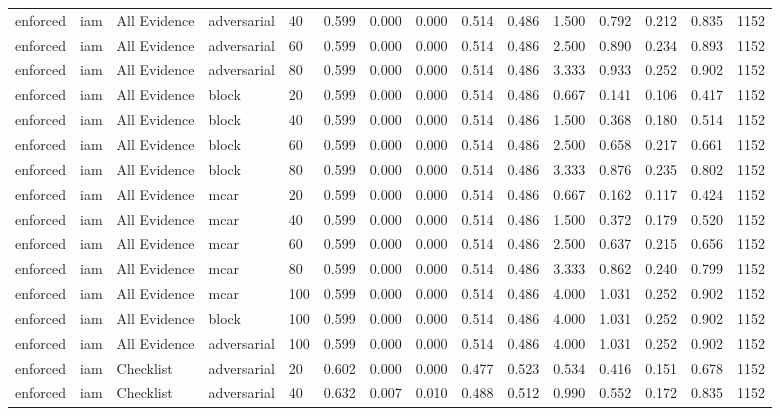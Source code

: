 \begin{table}[!ht]
{\begin{tabular}{lllllllllllllll}
enforced & iam & All Evidence & adversarial & 40 & 0.599 & 0.000 & 0.000 & 0.514 & 0.486 & 1.500 & 0.792 & 0.212 & 0.835 & 1152 \\
enforced & iam & All Evidence & adversarial & 60 & 0.599 & 0.000 & 0.000 & 0.514 & 0.486 & 2.500 & 0.890 & 0.234 & 0.893 & 1152 \\
enforced & iam & All Evidence & adversarial & 80 & 0.599 & 0.000 & 0.000 & 0.514 & 0.486 & 3.333 & 0.933 & 0.252 & 0.902 & 1152 \\
enforced & iam & All Evidence & block & 20 & 0.599 & 0.000 & 0.000 & 0.514 & 0.486 & 0.667 & 0.141 & 0.106 & 0.417 & 1152 \\
enforced & iam & All Evidence & block & 40 & 0.599 & 0.000 & 0.000 & 0.514 & 0.486 & 1.500 & 0.368 & 0.180 & 0.514 & 1152 \\
enforced & iam & All Evidence & block & 60 & 0.599 & 0.000 & 0.000 & 0.514 & 0.486 & 2.500 & 0.658 & 0.217 & 0.661 & 1152 \\
enforced & iam & All Evidence & block & 80 & 0.599 & 0.000 & 0.000 & 0.514 & 0.486 & 3.333 & 0.876 & 0.235 & 0.802 & 1152 \\
enforced & iam & All Evidence & mcar & 20 & 0.599 & 0.000 & 0.000 & 0.514 & 0.486 & 0.667 & 0.162 & 0.117 & 0.424 & 1152 \\
enforced & iam & All Evidence & mcar & 40 & 0.599 & 0.000 & 0.000 & 0.514 & 0.486 & 1.500 & 0.372 & 0.179 & 0.520 & 1152 \\
enforced & iam & All Evidence & mcar & 60 & 0.599 & 0.000 & 0.000 & 0.514 & 0.486 & 2.500 & 0.637 & 0.215 & 0.656 & 1152 \\
enforced & iam & All Evidence & mcar & 80 & 0.599 & 0.000 & 0.000 & 0.514 & 0.486 & 3.333 & 0.862 & 0.240 & 0.799 & 1152 \\
enforced & iam & All Evidence & mcar & 100 & 0.599 & 0.000 & 0.000 & 0.514 & 0.486 & 4.000 & 1.031 & 0.252 & 0.902 & 1152 \\
enforced & iam & All Evidence & block & 100 & 0.599 & 0.000 & 0.000 & 0.514 & 0.486 & 4.000 & 1.031 & 0.252 & 0.902 & 1152 \\
enforced & iam & All Evidence & adversarial & 100 & 0.599 & 0.000 & 0.000 & 0.514 & 0.486 & 4.000 & 1.031 & 0.252 & 0.902 & 1152 \\
enforced & iam & Checklist & adversarial & 20 & 0.602 & 0.000 & 0.000 & 0.477 & 0.523 & 0.534 & 0.416 & 0.151 & 0.678 & 1152 \\
enforced & iam & Checklist & adversarial & 40 & 0.632 & 0.007 & 0.010 & 0.488 & 0.512 & 0.990 & 0.552 & 0.172 & 0.835 & 1152 \\

\end{tabular}}
\end{table}
